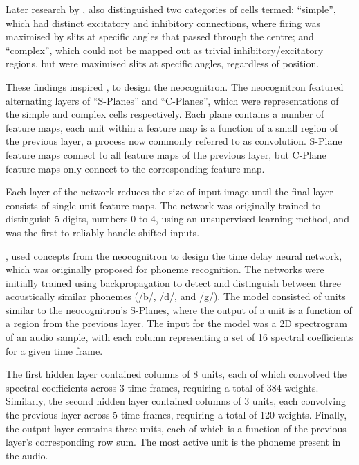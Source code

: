 Later research by \cite{Hubel:1962:Receptive}, also distinguished two categories
of cells termed:
``simple'', which had distinct excitatory and inhibitory connections, where
firing was maximised by slits at specific angles that passed through the centre;
and ``complex'', which could not be mapped out as trivial inhibitory/excitatory
regions, but were maximised slits at specific angles, regardless of position.



These findings inspired \cite{Fukushima:1980:Neocognitron}, to design the
neocognitron.
The neocognitron featured alternating layers of ``S-Planes'' and ``C-Planes'',
which were representations of the simple and complex cells respectively.
Each plane contains a number of feature maps, each unit within a feature map
is a function of a small region of the previous layer, a process now commonly
referred to as convolution.
S-Plane feature maps connect to all feature maps of the previous layer,
but C-Plane feature maps only connect to the corresponding feature map.
\begin{center}
    
\end{center}
Each layer of the network reduces the size of input image until the final layer
consists of single unit feature maps.
The network was originally trained to distinguish 5 digits, numbers 0 to 4,
using an unsupervised learning method, and was the first to reliably handle
shifted inputs.



\cite{Waibel:1989:Phoneme}, used concepts from the neocognitron to design the
time delay neural network, which was originally proposed for phoneme
recognition.
The networks were initially trained using backpropagation to detect and
distinguish between three acoustically similar phonemes (/b/, /d/, and /g/).
The model consisted of units similar to the neocognitron's S-Planes, where the
output of a unit is a function of a region from the previous layer.
The input for the model was a 2D spectrogram of an audio sample, with each
column representing a set of 16 spectral coefficients for a given time frame.

The first hidden layer contained columns of 8 units, each of which convolved the
spectral coefficients across 3 time frames, requiring a total of 384 weights.
Similarly, the second hidden layer contained columns of 3 units, each convolving
the previous layer across 5 time frames, requiring a total of 120 weights.
Finally, the output layer contains three units, each of which is a function of
the previous layer's corresponding row sum.
The most active unit is the phoneme present in the audio.

